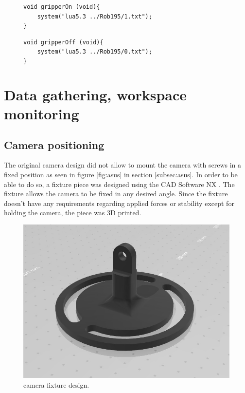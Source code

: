 \begin{figure}[H]
\begin{lstlisting}[frame = single, caption={gripperOn function}, captionpos=b, label={lst:gripON}]  
void gripperOn (void){
	system("lua5.3 ../Rob195/1.txt");
}
\end{lstlisting}
\end{figure}
\begin{figure}[H]
\begin{lstlisting}[frame = single, caption={gripperOff function}, captionpos=b, label={lst:gripOFF}]  
void gripperOff (void){
	system("lua5.3 ../Rob195/0.txt");
}
\end{lstlisting}
\end{figure}
\section{Data gathering, workspace monitoring}
\label{sec:datagather}
\subsection{Camera positioning}
\label{subsec:campos}
The original camera design did not allow to mount the camera with screws in a fixed position as seen in figure \ref{fig:asus} in section \ref{subsec:asus}. In order to be able to do so, a fixture piece was designed using the CAD Software NX \cite{NX}. The fixture allows the camera to be fixed in any desired angle. Since the fixture doesn't have any requirements regarding applied forces or stability except for holding the camera, the piece was 3D printed.

\begin{figure}[H]                                      
	\centering\includegraphics[scale=0.45]{images/halter.jpg}			
	\caption{camera fixture design.}
	\label{fig:camfix}                      
\end{figure}

